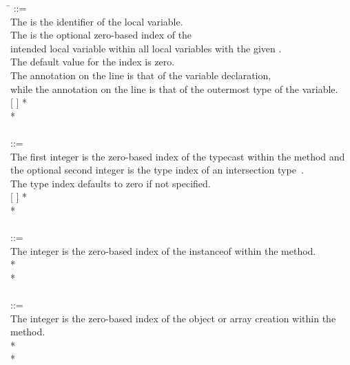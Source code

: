 \documentclass{article}
\begin{document}
\begin{tabbing}
\qquad \= \kill
{} ::= \\
\qquad    \bnfcmt The  is the identifier of the local variable.\\
\qquad    \bnfcmt The  is the optional zero-based index of the\\
\qquad    \bnfcmt intended local variable within all local variables with the given
.\\
\qquad    \bnfcmt The default value for the index is zero.\\
\qquad    \bnfcmt The annotation on the  line is that of the variable declaration, \\
\qquad    \bnfcmt while the annotation on the  line is that of the outermost type of the variable. \\
\qquad    {}  [\bnflit{*} ] \bnflit{:} * \lineend \\
\qquad    {}* \\
\\
 ::= \\
\qquad    \bnfcmt The first integer is the zero-based index of the
typecast within the method and \\
\qquad    \bnfcmt the optional second integer is the type index of an intersection type~\cite{JSR308}. \\
\qquad    \bnfcmt The type index defaults to zero if not specified. \\
\qquad    {} \bnflit{*}  [ \bnflit{,}  ] \bnflit{:} * \lineend \\
\qquad    {}* \\
\\
 ::= \\
\qquad    \bnfcmt The integer is the zero-based index of the
instanceof within the method. \\
\qquad    {} \bnflit{*}  \bnflit{:} * \lineend \\
\qquad    {}* \\
\\
 ::= \\
\qquad    \bnfcmt The integer is the zero-based index of the
object or array creation within the method. \\
\qquad    {} \bnflit{*}  \bnflit{:} * \lineend  \\
\qquad    {}*
\end{tabbing}
\end{document}
